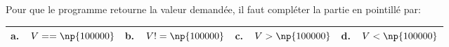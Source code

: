 Pour que le programme retourne la valeur demandée, il faut compléter la partie en pointillé par:

\begin{center}
\begin{tabularx}{\linewidth}{|*{4}{X|}}\hline
\textbf{a.~~}$V = = \np{100000}$ &\textbf{b.~~}$V!= \np{100000}$&\textbf{c.~~}$V > \np{100000}$&\textbf{d.~~}$ V < \np{100000}$\\ \hline
\end{tabularx}
\end{center}

\bigskip
